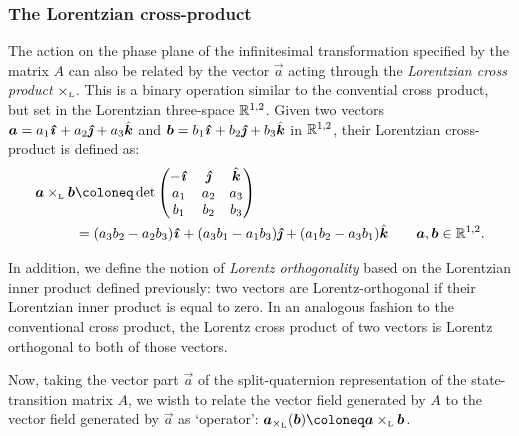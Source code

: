 \subsubsection{The Lorentzian cross-product}
The action on the phase plane of the infinitesimal transformation specified by the matrix $A$ can also be related by the vector $\vec{a}$ acting through the \emph{Lorentzian cross product} $\times_\text{\tiny{L}} $. This is a binary operation similar to the convential cross product, but set in the Lorentzian three-space $\mathbb{R}^{1, 2}$. Given two vectors $\vec{a} = a_1\quati + a_2\quatj + a_3\quatk$ and $\vec{b} = b_1\quati + b_2\quatj + b_3\quatk$ in $\mathbb{R}^{1, 2}$, their Lorentzian cross-product is defined as: \cite{Jafari2014}
\begin{equation}
    \begin{split}
        \lorcrossp{\vec{a}}{\vec{b}} &\coloneq \det\mqty(-\quati & \quatj & \quatk \\ a_1 & a_2 & a_3 \\ b_1 & b_2 & b_3) \\
            &= \qty(a_3b_2 - a_2b_3)\quati + \qty(a_3b_1 - a_1b_3)\quatj + \qty(a_1b_2 - a_3b_1)\quatk \qquad \vec{a}, \vec{b} \in \real^{1, 2}.
    \end{split}
\end{equation}

In addition, we define the notion of \emph{Lorentz orthogonality} based on the Lorentzian inner product defined previously: two vectors are Lorentz-orthogonal if their Lorentzian inner product is equal to zero. In an analogous fashion to the conventional cross product, the Lorentz cross product of two vectors is Lorentz orthogonal to both of those vectors.

Now, taking the vector part $\vec{a}$ of the split-quaternion representation of the state-transition matrix $A$, we wisth to relate the vector field generated by $A$ to the vector field generated by $\vec{a}$ as `operator': $\vec{a}_{\lorcrossp{}{}}(\vec{b}) \coloneq \lorcrossp{\vec{a}}{\vec{b}}$.

